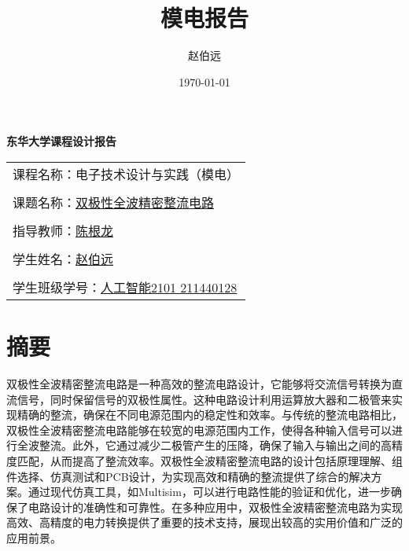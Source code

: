 \documentclass[UTF8,titlepage,a4paper]{ctexart}
\numberwithin{figure}{section}
\begin{document}
\title{模电报告}
\author{赵伯远}
\date{\today}
\thispagestyle{empty}
\begin{center}
{\fontsize{30pt}{21pt}\selectfont \textbf{东华大学课程设计报告}}

\vspace{10cm}

\begin{tabular}{l}
    {\large 课程名称：电子技术设计与实践（模电）} \\
    \\
    \large{课题名称：\underline{\hspace{40pt}双极性全波精密整流电路\hspace{40pt}}}  \\
    \\
    \large{指导教师：\underline{\hspace{70pt}陈根龙\hspace{70pt}}} \\
    \\
    \large{学生姓名：\underline{\hspace{70pt}赵伯远\hspace{70pt}}} \\
    \\
    \large{学生班级学号：\underline{\hspace{11pt}人工智能2101 211440128\hspace{11pt}}} \\
    \end{tabular}
\end{center}
\clearpage
\setcounter{page}{1}
\tableofcontents
\clearpage
\section{摘要}
双极性全波精密整流电路是一种高效的整流电路设计，它能够将交流信号转换为直流信号，同时保留信号的双极性属性。这种电路设计利用运算放大器和二极管来实现精确的整流，确保在不同电源范围内的稳定性和效率。与传统的整流电路相比，双极性全波精密整流电路能够在较宽的电源范围内工作，使得各种输入信号可以进行全波整流\cite{ti}。此外，它通过减少二极管产生的压降，确保了输入与输出之间的高精度匹配，从而提高了整流效率。双极性全波精密整流电路的设计包括原理理解、组件选择、仿真测试和PCB设计，为实现高效和精确的整流提供了综合的解决方案\cite{ti}。通过现代仿真工具，如Multisim，可以进行电路性能的验证和优化，进一步确保了电路设计的准确性和可靠性\cite{csdn}。在多种应用中，双极性全波精密整流电路为实现高效、高精度的电力转换提供了重要的技术支持，展现出较高的实用价值和广泛的应用前景。
\end{document}
